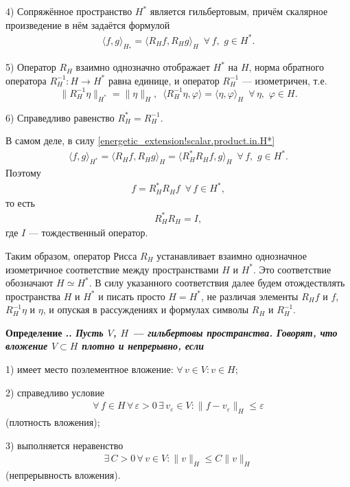 \documentclass{report}
\newcounter{defin}[section]
\renewcommand{\thedefin}{\thesection.\arabic{defin}}
\newenvironment{Definition}{\par\refstepcounter{defin}\bf Определение
\thedefin.\it}{\rm\par}
\begin{document}
4) Сопряжённое пространство $H^*$ является гильбертовым, причём скалярное произведение в нём задаётся формулой
\begin{gather}\label{energetic_extension!scalar.product.in.H*}
\langle f,g\rangle_{H_*}=\langle R_Hf,R_Hg\rangle_H\,\,\,\forall\,f,\,\,g\in H^*.
\end{gather}

5) Оператор $R_H$ взаимно однозначно отображает $H^*$ на $H$, норма обратного оператора $R_H^{-1}:H\to H^*$ равна единице, и оператор $R^{-1}_H$ --- изометричен, т.е.
$$
\|R_H^{-1}\eta\|_{H^*}=\|\eta\|_H,\,\,\,\langle R^{-1}_H\eta,\varphi\rangle=\langle\eta,\varphi\rangle_H\,\,\,\forall\,\eta,\,\,\varphi\in H.
$$

6) Справедливо равенство $R_H^*=R_H^{-1}$.

В самом деле, в силу \eqref{energetic_extension!scalar.product.in.H*}
\begin{gather*}
\langle f,g\rangle_{H^*}=\langle R_Hf,R_Hg\rangle_H=\langle R_H^*R_Hf,g\rangle_H\,\,\,\forall\,f,\,\,g\in H^*.
\end{gather*}
Поэтому
\begin{gather*}
f=R_H^*R_Hf\,\,\,\forall\,f\in H^*,
\end{gather*}
то есть
\begin{gather*}
R_H^*R_H=I,
\end{gather*}
где $I$ --- тождественный оператор.

Таким образом, оператор Рисса $R_H$ устанавливает взаимно однозначное изометричное соответствие между пространствами $H$ и $H^*$. Это соответствие обозначают $H\simeq H^*$. В силу
указанного соответствия далее будем отождествлять пространства $H$ и $H^*$ и писать просто $H=H^*$, не различая элементы $R_Hf$ и $f$, $R_H^{-1}\eta$ и $\eta$, и опуская в рассуждениях и
формулах символы $R_H$ и $R_H^{-1}$.

\begin{Definition}
Пусть $V$, $H$ --- гильбертовы пространства. Говорят, что вложение $V\subset H$ плотно и непрерывно, если

1) имеет место поэлементное вложение: $\forall\,v\in V:v\in H$;

2) справедливо условие
\begin{gather*}
\forall\,f\in H\,\forall\,\varepsilon>0\,\exists\,v_\varepsilon\in V:\|f-v_\varepsilon\|_H\leqslant\varepsilon
\end{gather*}
(плотность вложения);

3) выполняется неравенство
\begin{gather}\label{energetic_extension!continuity.of.embedding}
\exists\,C>0\,\forall\,v\in V:\|v\|_H\leqslant C\|v\|_H
\end{gather}
(непрерывность вложения).
\end{Definition}
\end{document}
